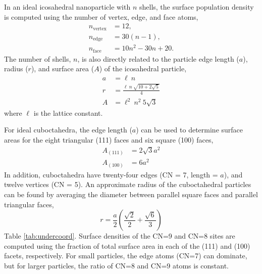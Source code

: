 In an ideal icosahedral nanoparticle with $n$ shells, the surface
population density is computed using the number of vertex, edge, and
face atoms,
\begin{align}
n_\text{vertex} & = 12, \\
n_\text{edge} & = 30 (n -1), \\
n_\text{face} & = 10 n^2 - 30 n + 20.
\end{align}
The number of shells, $n$, is also directly related to the particle
edge length ($a$), radius ($r$), and surface area ($A$) of the
icosahedral particle,
\begin{align}
a & = \ell~n \\
r & = \frac{\ell~n~\sqrt{10+2\sqrt{5}}}{4} \\
A & =  \ell^2~n^2~ 5 \sqrt{3}
\end{align}
where $\ell$ is the lattice constant.

For ideal cuboctahedra, the edge length ($a$) can be used to determine
surface areas for the eight triangular (111) faces and six square
(100) faces,
\begin{align}
A_\mathrm{(111)} &= 2 \sqrt{3} a^2 \\
A_\mathrm{(100)} &= 6 a^2
\end{align}
In addition, cuboctahedra have twenty-four edges (CN = 7, length =
$a$), and twelve vertices (CN = 5).  An approximate radius of the
cuboctahedral particles can be found by averaging the diameter between
parallel square faces and parallel triangular faces,
\begin{equation}
r  = \frac{a}{2} \left(\frac{\sqrt{2}}{2} + \frac{\sqrt{6}}{3}\right)
\label{r_ave}
\end{equation}
Table \ref{tab:undercoord}.  Surface densities of the CN=9 and CN=8
sites are computed using the fraction of total surface area in each of
the (111) and (100) facets, respectively.  For small particles, the
edge atoms (CN=7) can dominate, but for larger particles, the ratio of
CN=8 and CN=9 atoms is constant.




